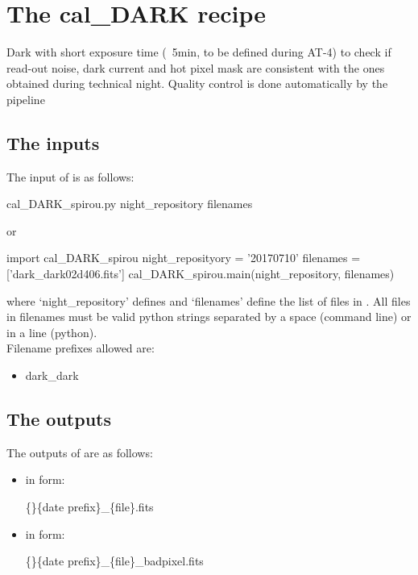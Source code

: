 \section{The cal\_DARK recipe}
\label{ch:the_recipes:cal_DARK_spirou}

Dark with short exposure time (~5min, to be defined during AT-4) to check if read-out noise, dark current and hot pixel mask are consistent with the ones obtained during technical night. Quality control is done automatically by the pipeline \\


\subsection{The inputs}
The input of \calDARK is as follows:
\begin{cmdbox}
cal_DARK_spirou.py  night_repository  filenames
\end{cmdbox}
\noindent or
\begin{pythonbox}
import cal_DARK_spirou
night_reposityory = '20170710'
filenames = ['dark_dark02d406.fits']
cal_DARK_spirou.main(night_repository, filenames)
\end{pythonbox}

\noindent where `night\_repository' defines \argnightname and `filenames' define the list of files in \argfilenames. All files in filenames must be valid python strings separated by a space (command line) or in a line (python). \\

\noindent Filename prefixes allowed are:
\begin{itemize}
	\item dark\_dark
\end{itemize}

\subsection{The outputs}
The outputs of \calDARK are as follows:

\begin{itemize}
\item {} in form:
\begin{tcustomdir}
\{\reduceddir\}\{date prefix\}\_\{file\}.fits
\end{tcustomdir}

\item {} in form:
\begin{tcustomdir}
\{\reduceddir\}\{date prefix\}\_\{file\}\_badpixel.fits
\end{tcustomdir}
\end{itemize}

